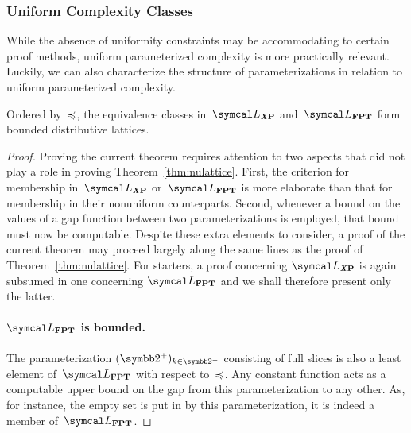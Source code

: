 \subsubsection{Uniform Complexity Classes}
While the absence of uniformity constraints may be accommodating to certain proof methods, uniform parameterized complexity is more practically relevant.
Luckily, we can also characterize the structure of parameterizations in relation to uniform parameterized complexity.
\begin{theorem}
\label{thm:lattice}%
  Ordered by~$\preccurlyeq$, the equivalence classes in~$\calL_\clX{P}$ and~$\calL_\cl{FPT}$ form bounded distributive lattices.
\end{theorem}
\begin{proof}
  Proving the current theorem requires attention to two aspects that did not play a role in proving  Theorem~\ref{thm:nulattice}.
  First, the criterion for membership in~$\calL_\clX{P}$ or~$\calL_\cl{FPT}$ is more elaborate than that for membership in their nonuniform counterparts.
  Second, whenever a bound on the values of a gap function between two parameterizations is employed, that bound must now be computable.
  Despite these extra elements to consider, a proof of the current theorem may proceed largely along the same lines as the proof of Theorem~\ref{thm:nulattice}.
  For starters, a proof concerning $\calL_\clX{P}$ is again subsumed in one concerning $\calL_\cl{FPT}$ and we shall therefore present only the latter.

  \paragraph{$\calL_\cl{FPT}$ is bounded.}
  The parameterization $(\binary^+)_{k \in \binary^+}$ consisting of full slices is also a least element of~$\calL_\cl{FPT}$ with respect to~$\preccurlyeq$.
  Any constant function acts as a computable upper bound on the gap from this parameterization to any other.
  As, for instance, the empty set is put in  by this parameterization, it is indeed a member of~$\calL_\cl{FPT}$.


\end{proof}
